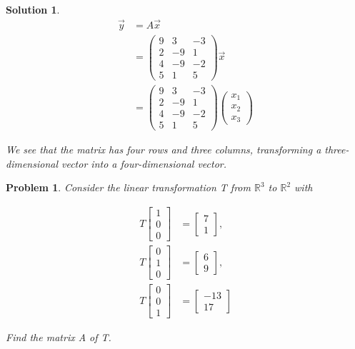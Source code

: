 \documentclass{article}
\newtheorem{problem}{Problem}
\newtheorem*{solution}{Solution}
\begin{document}
\begin{solution}

\begin{align*}
\vec{y} &= A \vec{x} \\
&= \begin{pmatrix}
9 & 3 & -3 \\
2 & -9 & 1 \\
4 & -9 & -2 \\
5 & 1 & 5 
\end{pmatrix}
\vec{x} \\
&= \begin{pmatrix}
9 & 3 & -3 \\
2 & -9 & 1 \\
4 & -9 & -2 \\
5 & 1 & 5 
\end{pmatrix}
\begin{pmatrix}
x_{1} \\ x_{2} \\ x_{3}
\end{pmatrix}
\end{align*}

We see that the matrix has four rows and three columns, transforming a three-dimensional vector into a four-dimensional vector.

\end{solution}

\begin{problem}
Consider the linear transformation T from $\mathbb{R}^3$ to $\mathbb{R}^2$ with 

\begin{align*}
T \begin{bmatrix} 1 \\ 0 \\ 0 \end{bmatrix} &= \begin{bmatrix} 7 \\ 1 \end{bmatrix}, \\
T \begin{bmatrix} 0 \\ 1 \\ 0 \end{bmatrix} &= \begin{bmatrix} 6 \\ 9 \end{bmatrix}, \\
T \begin{bmatrix} 0 \\ 0 \\ 1 \end{bmatrix} &= \begin{bmatrix} -13 \\ 17 \end{bmatrix}
\end{align*}

Find the matrix A of T.
\end{problem}
\end{document}
